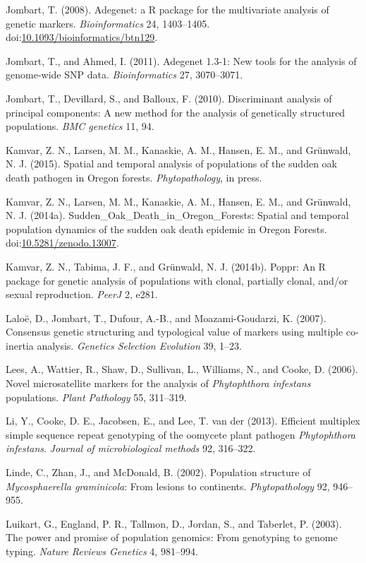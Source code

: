 \documentclass{frontiersSCNS} %
\begin{document}
Jombart, T. (2008). Adegenet: a R package for the multivariate analysis
of genetic markers. \emph{Bioinformatics} 24, 1403--1405.
doi:\href{http://dx.doi.org/10.1093/bioinformatics/btn129}{10.1093/bioinformatics/btn129}.

Jombart, T., and Ahmed, I. (2011). Adegenet 1.3-1: New tools for the
analysis of genome-wide SNP data. \emph{Bioinformatics} 27, 3070--3071.

Jombart, T., Devillard, S., and Balloux, F. (2010). Discriminant
analysis of principal components: A new method for the analysis of
genetically structured populations. \emph{BMC genetics} 11, 94.

Kamvar, Z. N., Larsen, M. M., Kanaskie, A. M., Hansen, E. M., and
Gr\"{u}nwald, N. J. (2015). Spatial and temporal analysis of populations of
the sudden oak death pathogen in Oregon forests. \emph{Phytopathology},
in press.

Kamvar, Z. N., Larsen, M. M., Kanaskie, A. M., Hansen, E. M., and
Gr\"{u}nwald, N. J. (2014a). Sudden\_Oak\_Death\_in\_Oregon\_Forests:
Spatial and temporal population dynamics of the sudden oak death
epidemic in Oregon Forests.
doi:\href{http://dx.doi.org/10.5281/zenodo.13007}{10.5281/zenodo.13007}.

Kamvar, Z. N., Tabima, J. F., and Gr{\"{u}}nwald, N. J. (2014b). Poppr: An R
package for genetic analysis of populations with clonal, partially
clonal, and/or sexual reproduction. \emph{PeerJ} 2, e281.

Lalo{\"{e}}, D., Jombart, T., Dufour, A.-B., and Moazami-Goudarzi, K.
(2007). Consensus genetic structuring and typological value of markers
using multiple co-inertia analysis. \emph{Genetics Selection Evolution}
39, 1--23.

Lees, A., Wattier, R., Shaw, D., Sullivan, L., Williams, N., and Cooke,
D. (2006). Novel microsatellite markers for the analysis of
\emph{Phytophthora infestans} populations. \emph{Plant Pathology} 55,
311--319.

Li, Y., Cooke, D. E., Jacobsen, E., and Lee, T. van der (2013).
Efficient multiplex simple sequence repeat genotyping of the oomycete
plant pathogen \emph{Phytophthora infestans}. \emph{Journal of
microbiological methods} 92, 316--322.

Linde, C., Zhan, J., and McDonald, B. (2002). Population structure of
\emph{Mycosphaerella graminicola}: From lesions to continents.
\emph{Phytopathology} 92, 946--955.

Luikart, G., England, P. R., Tallmon, D., Jordan, S., and Taberlet, P.
(2003). The power and promise of population genomics: From genotyping to
genome typing. \emph{Nature Reviews Genetics} 4, 981--994.
\end{document}
